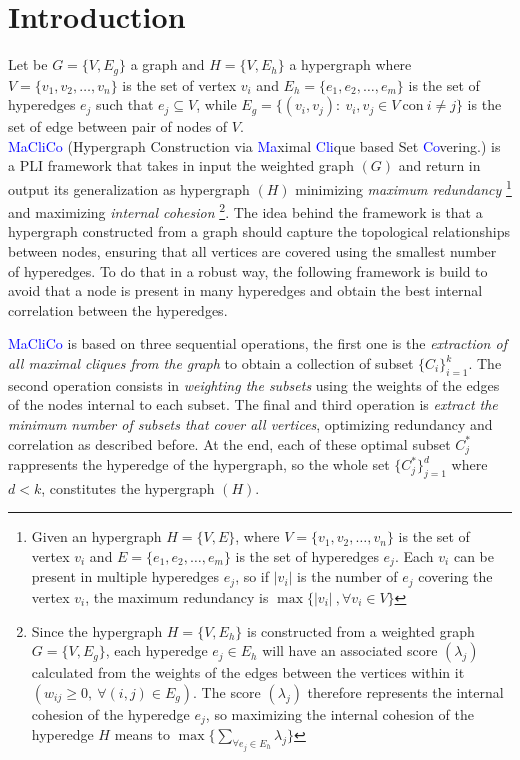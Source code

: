 \documentclass[10pt]{article} %
\begin{document}
\section{Introduction}
\label{framework}
Let be $G=\{V,E_{g}\}$ a graph and $H = \{V, E_{h}\}$ a hypergraph where $V=\{v_1, v_2,\dots,v_n\}$ is the set of vertex $v_{i}$ and $E_{h} = \{e_{1}, e_{2}, \dots, e_{m}\}$ is the set of hyperedges $e_{j}$ such that $e_{j} \subseteq V$, while $E_{g} = \{(v_{i}, v_{j}): \ v_{i}, v_{j}\in V\ \text{con}\ i\not = j\}$ is the set of edge between pair of nodes of $V$.\\
\textcolor{blue}{MaCliCo} (Hypergraph Construction via \textcolor{blue}{Ma}ximal \textcolor{blue}{Cli}que based Set \textcolor{blue}{Co}vering.) is a PLI framework that takes in input the weighted graph $(G)$ and return in output its generalization as hypergraph $(H)$ minimizing\textit{ maximum redundancy}
\footnote{Given an hypergraph $H = \{V, E\}$, where $V=\{v_1, v_2,\dots,v_n\}$ is the set of vertex $v_{i}$ and $E = \{e_{1}, e_{2}, \dots, e_{m}\}$ is the set of hyperedges $e_{j}$. Each $v_{i}$ can be present in multiple hyperedges $e_{j}$, so if $|v_{i}|$ is the number of $e_{j}$ covering the vertex $v_i$, the maximum redundancy is $\max \{|v_{i}|\ , \forall v_{i}\in V\}$}
and maximizing \textit{internal cohesion}
\footnote{Since the hypergraph $H = \{V, E_{h}\}$ is constructed from a weighted graph $G=\{V,E_{g}\}$, each hyperedge $e_{j}\in E_{h}$ will have an associated score $(\lambda_j)$ calculated from the weights of the edges between the vertices within it $(w_{ij}\ge 0, \ \forall(i,j) \in E_{g})$. The score $(\lambda_j)$ therefore represents the internal cohesion of the hyperedge $e_{j}$, so maximizing the internal cohesion of the hyperedge $H$ means to $\max \{\sum_{\forall e_{j}\in E_{h}} \lambda_j \}$}.
The idea behind the framework is that a hypergraph constructed from a graph should capture the topological relationships between nodes, ensuring that all vertices are covered using the smallest number of hyperedges. To do that in a robust way, the following framework is build to avoid that a node is present in many hyperedges and obtain the best internal correlation between the hyperedges.

\textcolor{blue}{MaCliCo} is based on three sequential operations, the first one is the \textit{extraction of all maximal cliques from the graph} to obtain a collection of subset $\{C_{i}\}_{i=1}^{k}$. The second operation consists in \textit{weighting the subsets} using the weights of the edges of the nodes internal to each subset. The final and third operation is \textit{extract the minimum number of subsets that cover all vertices}, optimizing redundancy and correlation as described before. At the end, each of these optimal subset $C_{j}^{*}$ rappresents the hyperedge of the hypergraph, so the whole set $\{C_{j}^{*}\}_{j=1}^{d}$ where $d<k$, constitutes the hypergraph $(H)$.
\end{document}
